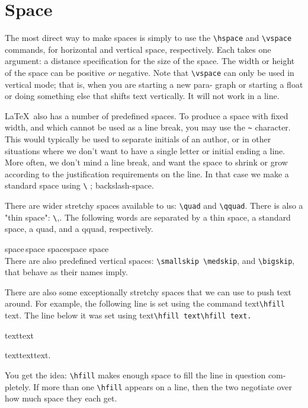 \documentclass[12pt]{article}
\begin{document}
\section{Space}
The most direct way to make spaces is simply to use the \verb|\hspace| and
\verb|\vspace| commands, for horizontal and vertical space, respectively. Each
takes one argument: a distance specification for the size of the space. The
width or height of the space can be positive {\it or} negative. Note that \verb|\vspace|
can only be used in vertical mode; that is, when you are starting a new para-
graph or starting a float or doing something else that shifts text vertically.
It will not work in a line.

\LaTeX\ also has a number of predefined spaces. To produce a space with
fixed width, and which cannot be used as a line break, you may use the \verb|~|
character. This would typically be used to separate initials of an author,
or in other situations where we don’t want to have a single letter or initial
ending a line. More often, we don’t mind a line break, and want the space
to shrink or grow according to the justification requirements on the line. In
that case we make a standard space using \verb|\| ; backslash-space.

There are wider stretchy spaces available to us: \verb|\quad| and \verb|\qquad|. There
is also a "thin space": \verb|\|,. The following words are separated by a thin space,
a standard space, a quad, and a qquad, respectively.

\vspace{8pt}
	\hspace{90pt} space\,space space\quad space\qquad
	space\\
	
	There are also predefined vertical spaces: \verb|\smallskip \medskip|, and
	\verb|\bigskip|, that behave as their names imply.
	
	There are also some exceptionally stretchy spaces that we can use to
	push text around. For example, the following line is set using the command
	text\verb|\hfill| text. The line below it was set using text\verb|\hfill text\hfill text.|
	
	\noindent text\hfill text
	
	\noindent text\hfill text\hfill text.
	
\noindent	You get the idea: \verb|\hfill| makes enough space to fill the line in question com-
	pletely. If more than one \verb|\hfill| appears on a line, then the two negotiate
	over how much space they each get.
	
\end{document}
